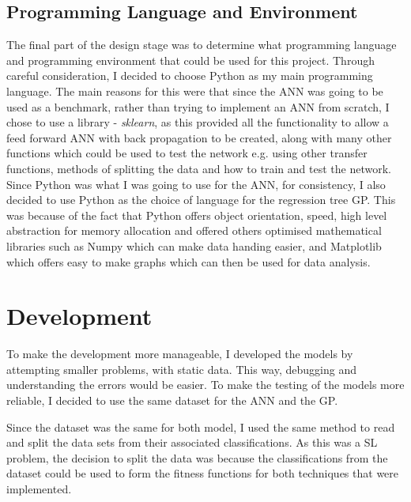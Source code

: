 \documentclass[11pt]{article}
\begin{document}
\subsection{Programming Language and Environment}
The final part of the design stage was to determine what programming language and programming environment that could be used for this project. Through careful consideration, I decided to choose Python as my main programming language. The main reasons for this were that since the ANN was going to be used as a benchmark, rather than trying to implement an ANN from scratch, I chose to use a library - \textit{sklearn}, as this provided all the functionality to allow a feed forward ANN with back propagation to be created, along with many other functions which could be used to test the network e.g. using other transfer functions, methods of splitting the data and how to train and test the network. Since Python was what I was going to use for the ANN, for consistency, I also decided to use Python as the choice of language for the regression tree GP. This was because of the fact that Python offers object orientation, speed, high level abstraction for memory allocation and offered others optimised mathematical libraries such as Numpy which can make data handing easier, and Matplotlib which offers easy to make graphs which can then be used for data analysis. 
\section{Development}
To make the development more manageable, I developed the models by attempting smaller problems, with static data. This way, debugging and understanding the errors would be easier. To make the testing of the models more reliable, I decided to use the same dataset for the ANN and the GP. 

Since the dataset was the same for both model, I used the same method to read and split the data sets from their associated classifications. As this was a SL problem, the decision to split the data was because the classifications from the dataset could be used to form the fitness functions for both techniques that were implemented.
\end{document}
